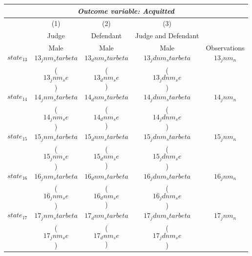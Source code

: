 {
\def\sym#1{\ifmmode^{#1}\else\(^{#1}\)\fi}
\begin{tabular}{l*{4}{c}}
  \hline\hline
\multicolumn{5}{c}{\textit{Outcome variable: Acquitted}}\\
\hline
&\multicolumn{1}{c}{(1)}&\multicolumn{1}{c}{(2)}&\multicolumn{1}{c}{(3)} &\multicolumn{1}{c}{}\\

\hspace{15mm}& Judge & Defendant & Judge and Defendant \\

\hspace{15mm} & Male & Male & Male & Observations \\
\hline 

$$state_13$$ \hspace{15mm} & $$13_jnm_starbeta$$ & $$13_dnm_starbeta$$ & $$13_jdnm_starbeta$$ & $$13_jnm_n$$ \\
                           & ($$13_jnm_se$$)     & ($$13_dnm_se$$)     & ($$13_jdnm_se$$)                    \\[2.5mm]
\hline

$$state_14$$ \hspace{15mm} & $$14_jnm_starbeta$$ & $$14_dnm_starbeta$$ & $$14_jdnm_starbeta$$ & $$14_jnm_n$$ \\
                           & ($$14_jnm_se$$)     & ($$14_dnm_se$$)     & ($$14_jdnm_se$$)                    \\[2.5mm]
\hline

$$state_15$$ \hspace{15mm} & $$15_jnm_starbeta$$ & $$15_dnm_starbeta$$ & $$15_jdnm_starbeta$$ & $$15_jnm_n$$ \\
                           & ($$15_jnm_se$$)     & ($$15_dnm_se$$)     & ($$15_jdnm_se$$)                    \\[2.5mm]
\hline

$$state_16$$ \hspace{15mm} & $$16_jnm_starbeta$$ & $$16_dnm_starbeta$$ & $$16_jdnm_starbeta$$ & $$16_jnm_n$$ \\
                           & ($$16_jnm_se$$)     & ($$16_dnm_se$$)     & ($$16_jdnm_se$$)                    \\[2.5mm]
\hline

$$state_17$$ \hspace{15mm} & $$17_jnm_starbeta$$ & $$17_dnm_starbeta$$ & $$17_jdnm_starbeta$$ & $$17_jnm_n$$ \\
                           & ($$17_jnm_se$$)     & ($$17_dnm_se$$)     & ($$17_jdnm_se$$)                    \\[2.5mm]
\hline


\end{tabular}}
